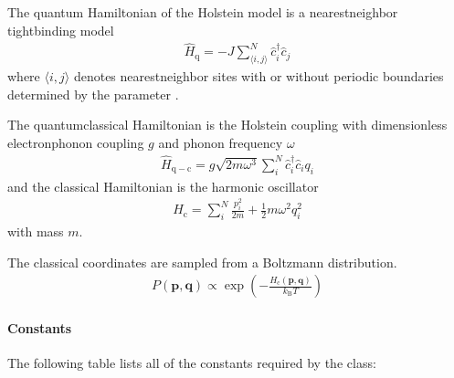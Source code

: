 \documentclass[letterpaper,10pt,english]{sphinxmanual}
\begin{document}
\sphinxAtStartPar
The quantum Hamiltonian of the Holstein model is a nearest\sphinxhyphen{}neighbor tight\sphinxhyphen{}binding model
\begin{equation*}
\begin{split}\hat{H}_{\mathrm{q}} = -J\sum_{\langle i,j\rangle}^{N}\hat{c}^{\dagger}_{i}\hat{c}_{j}\end{split}
\end{equation*}
\sphinxAtStartPar
where \(\langle i,j\rangle\) denotes nearest\sphinxhyphen{}neighbor sites with or without periodic boundaries determined by the parameter .

\sphinxAtStartPar
The quantum\sphinxhyphen{}classical Hamiltonian is the Holstein coupling with dimensionless electron\sphinxhyphen{}phonon coupling \(g\) and phonon frequency \(\omega\)
\begin{equation*}
\begin{split}\hat{H}_{\mathrm{q-c}} = g\sqrt{2m\omega^{3}}\sum_{i}^{N} \hat{c}^{\dagger}_{i}\hat{c}_{i} q_{i}\end{split}
\end{equation*}
\sphinxAtStartPar
and the classical Hamiltonian is the harmonic oscillator
\begin{equation*}
\begin{split}H_{\mathrm{c}} = \sum_{i}^{N} \frac{p_{i}^{2}}{2m} + \frac{1}{2}m\omega^{2}q_{i}^{2}\end{split}
\end{equation*}
\sphinxAtStartPar
with mass \(m\).

\sphinxAtStartPar
The classical coordinates are sampled from a Boltzmann distribution.
\begin{equation*}
\begin{split}P(\boldsymbol{p},\boldsymbol{q}) \propto \exp\left(-\frac{H_{\mathrm{c}}(\boldsymbol{p},\boldsymbol{q})}{k_{\mathrm{B}}T}\right)\end{split}
\end{equation*}

\paragraph{Constants}
\label{\detokenize{user_guide/models/holstein_model:constants}}
\sphinxAtStartPar
The following table lists all of the constants required by the  class:
\end{document}
